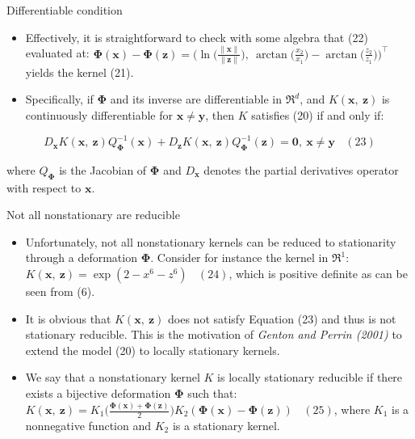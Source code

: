 \documentclass[
  ignorenonframetext,
]{beamer}
\begin{document}
\begin{frame}{Differentiable condition}
\protect\hypertarget{differentiable-condition}{}
\begin{itemize}
\item
  Effectively, it is straightforward to check with some algebra that
  (22) evaluated at:
  \(\pmb\Phi(\pmb x) - \pmb\Phi(\pmb z) = \bigg( \ln\Big(\frac {\|\pmb x\|}{\|\pmb z\|}\Big),\ \arctan \big(\frac {x_2} {x_1}\big) - \arctan\big(\frac {z_2} {z_1}\big) \bigg)^{\top}\)
  yields the kernel (21).
\item
  Specifically, if \(\pmb \Phi\) and its inverse are differentiable in
  \(\mathfrak R^d\), and \(K(\pmb x,\ \pmb z)\) is continuously
  differentiable for \(\pmb x \neq \pmb y\), then \(K\) satisfies (20)
  if and only if:
\end{itemize}

\[
D_{\pmb x}K(\pmb x,\ \pmb z)Q^{-1}_{\pmb \Phi}(\pmb x) + D_{\pmb z}K(\pmb x,\ \pmb z)Q^{-1}_{\pmb \Phi} (\pmb z) = \pmb 0,\ \pmb x \neq \pmb y \ \ \ \ (23)
\]

where \(Q_{\pmb \Phi}\) is the Jacobian of \(\pmb \Phi\) and
\(D_{\pmb x}\) denotes the partial derivatives operator with respect to
\(\pmb x\).
\end{frame}

\begin{frame}{Not all nonstationary are reducible}
\protect\hypertarget{not-all-nonstationary-are-reducible}{}
\begin{itemize}
\item
  Unfortunately, not all nonstationary kernels can be reduced to
  stationarity through a deformation \(\pmb \Phi\). Consider for
  instance the kernel in \(\mathfrak R^1\):
  \(K(\pmb x,\ \pmb z) = \exp(2-x^6-z^6) \ \ \ \ (24)\), which is
  positive definite as can be seen from (6).
\item
  It is obvious that \(K(\pmb x,\ \pmb z)\) does not satisfy Equation
  (23) and thus is not stationary reducible. This is the motivation of
  \emph{Genton and Perrin (2001)} to extend the model (20) to locally
  stationary kernels.
\item
  We say that a nonstationary kernel \(K\) is locally stationary
  reducible if there exists a bijective deformation \(\pmb \Phi\) such
  that:
  \(K(\pmb x,\ \pmb z) = K_1\Big(\frac {\pmb\Phi(\pmb x) + \pmb\Phi(\pmb z)} 2\Big) K_2 (\pmb\Phi(\pmb x) - \pmb\Phi(\pmb z)) \ \ \ \ (25)\),
  where \(K_1\) is a nonnegative function and \(K_2\) is a stationary
  kernel.
\end{itemize}
\end{frame}
\end{document}
